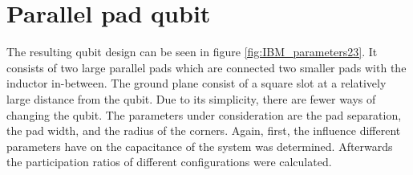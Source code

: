 
\clearpage
\section{Parallel pad qubit}
The resulting qubit design can be seen in figure \ref{fig:IBM_parameters23}. It consists of two large parallel pads which are connected two smaller pads with the inductor in-between. The ground plane consist of a square slot at a relatively large distance from the qubit. Due to its simplicity, there are fewer ways of changing the qubit. The parameters under consideration are the pad separation, the pad width, and the radius of the corners. Again, first, the influence different parameters have on the capacitance of the system was determined. Afterwards the participation ratios of different configurations were calculated.

